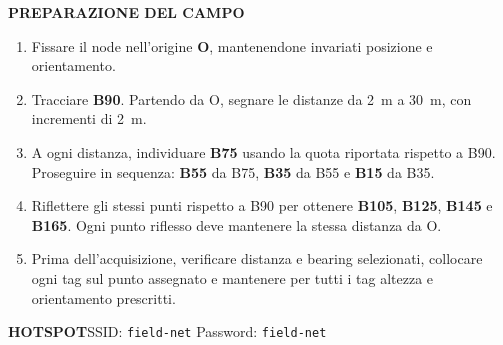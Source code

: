 \documentclass[a4paper]{article}
\begin{document}
\par\vspace{4mm}
\begin{minipage}{0.88\paperwidth}
  \sffamily\small
  \textbf{PREPARAZIONE DEL CAMPO}\par\vspace{2mm}
  \begin{enumerate}
    \setlength{\itemsep}{1.5mm}
    \setlength{\parskip}{0pt}
    \setlength{\topsep}{0pt}
    \item Fissare il node nell'origine \textbf{O}, mantenendone invariati posizione e orientamento.
    \item Tracciare \textbf{B90}. Partendo da O, segnare le distanze da \SI{2}{m} a
      \SI{30}{m}, con incrementi di \SI{2}{m}.
    \item A ogni distanza, individuare \textbf{B75} usando la quota riportata rispetto a B90.
      Proseguire in sequenza: \textbf{B55} da B75, \textbf{B35} da B55 e
      \textbf{B15} da B35.
    \item Riflettere gli stessi punti rispetto a B90 per ottenere \textbf{B105},
      \textbf{B125}, \textbf{B145} e \textbf{B165}. Ogni punto riflesso deve mantenere
      la stessa distanza da O.
    \item Prima dell'acquisizione, verificare distanza e bearing selezionati, collocare ogni
      tag sul punto assegnato e mantenere per tutti i tag altezza e orientamento prescritti.
  \end{enumerate}
  \vspace{1mm}
  \noindent\colorbox{black!7}{%
    \parbox{\dimexpr\linewidth-2\fboxsep\relax}{%
      \textbf{HOTSPOT}\hfill SSID: \texttt{field-net}\hspace{8mm}
      Password: \texttt{field-net}}}
\end{minipage}
\vspace*{\fill}
\end{document}
